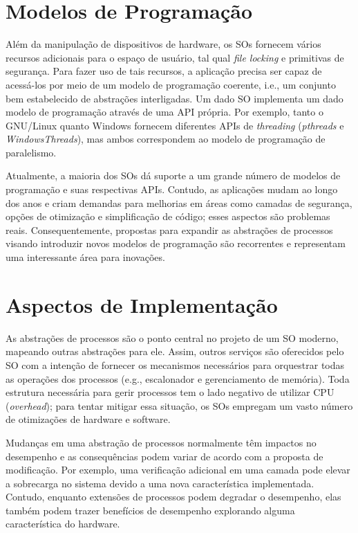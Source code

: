 \section{Modelos de Programação}

Além da manipulação de dispositivos de hardware, os SOs fornecem vários
recursos adicionais para o espaço de usuário, tal qual \emph{file locking} e
primitivas de segurança. Para fazer uso de tais recursos, a aplicação precisa
ser capaz de acessá-los por meio de um modelo de programação coerente, i.e., um
conjunto bem estabelecido de abstrações interligadas. Um dado SO implementa um
dado modelo de programação através de uma API própria. Por exemplo, tanto o
GNU/Linux quanto Windows fornecem diferentes APIs de \emph{threading}
(\emph{pthreads} e \emph{WindowsThreads}), mas ambos correspondem ao modelo de
programação de paralelismo.

Atualmente, a maioria dos SOs dá suporte a um grande número de modelos de
programação e suas respectivas APIs. Contudo, as aplicações mudam ao longo dos
anos e criam demandas para melhorias em áreas como camadas de segurança, opções
de otimização e simplificação de código; esses aspectos são problemas reais.
Consequentemente, propostas para expandir as abstrações de processos visando
introduzir novos modelos de programação são recorrentes e representam uma
interessante área para inovações.

\section{Aspectos de Implementação}

As abstrações de processos são o ponto central no projeto de um SO moderno,
mapeando outras abstrações para ele. Assim, outros serviços são oferecidos pelo
SO com a intenção de fornecer os mecanismos necessários para orquestrar todas
as operações dos processos (e.g., escalonador e gerenciamento de memória). Toda
estrutura necessária para gerir processos tem o lado negativo de utilizar CPU
(\emph{overhead}); para tentar mitigar essa situação, os SOs empregam um vasto
número de otimizações de hardware e software.

Mudanças em uma abstração de processos normalmente têm impactos no desempenho e
as consequências podem variar de acordo com a proposta de modificação. Por
exemplo, uma verificação adicional em uma camada pode elevar a sobrecarga no
sistema devido a uma nova característica implementada. Contudo, enquanto
extensões de processos podem degradar o desempenho, elas também podem trazer
benefícios de desempenho explorando alguma característica do hardware.


